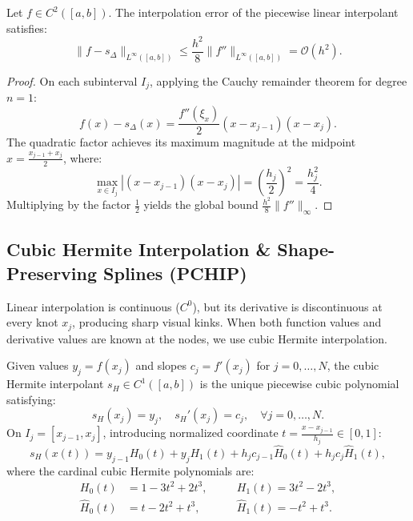 \begin{theorem}
    Let $f \in C^2([a, b])$. The interpolation error of the piecewise linear interpolant satisfies:
    \begin{equation}
        \|f - s_{\Delta}\|_{L^\infty([a, b])} \le \frac{h^2}{8} \|f''\|_{L^\infty([a, b])} = \mathcal{O}(h^2).
    \end{equation}
\end{theorem}
\begin{proof}
    On each subinterval $I_j$, applying the Cauchy remainder theorem for degree $n=1$:
    \begin{equation}
        f(x) - s_{\Delta}(x) = \frac{f''(\xi_x)}{2} (x - x_{j-1})(x - x_j).
    \end{equation}
    The quadratic factor achieves its maximum magnitude at the midpoint $x = \frac{x_{j-1} + x_j}{2}$, where:
    \begin{equation}
        \max_{x \in I_j} |(x - x_{j-1})(x - x_j)| = \left(\frac{h_j}{2}\right)^2 = \frac{h_j^2}{4}.
    \end{equation}
    Multiplying by the factor $\frac{1}{2}$ yields the global bound $\frac{h^2}{8} \|f''\|_\infty$.
\end{proof}

\subsection{Cubic Hermite Interpolation \& Shape-Preserving Splines (PCHIP)}

Linear interpolation is continuous ($C^0$), but its derivative is discontinuous at every knot $x_j$, producing sharp visual kinks. When both function values and derivative values are known at the nodes, we use cubic Hermite interpolation.

\begin{definition}
    Given values $y_j = f(x_j)$ and slopes $c_j = f'(x_j)$ for $j=0, \dots, N$, the cubic Hermite interpolant $s_H \in C^1([a, b])$ is the unique piecewise cubic polynomial satisfying:
    \begin{equation}
        s_H(x_j) = y_j, \quad s_H'(x_j) = c_j, \quad \forall j = 0, \dots, N.
    \end{equation}
    On $I_j = [x_{j-1}, x_j]$, introducing normalized coordinate $t = \frac{x - x_{j-1}}{h_j} \in [0, 1]$:
    \begin{equation}
        s_H(x(t)) = y_{j-1} H_0(t) + y_j H_1(t) + h_j c_{j-1} \widehat{H}_0(t) + h_j c_j \widehat{H}_1(t),
    \end{equation}
    where the cardinal cubic Hermite polynomials are:
    \begin{align}
        H_0(t) &= 1 - 3t^2 + 2t^3, \quad &&H_1(t) = 3t^2 - 2t^3, \\
        \widehat{H}_0(t) &= t - 2t^2 + t^3, \quad &&\widehat{H}_1(t) = -t^2 + t^3.
    \end{align}
\end{definition}


